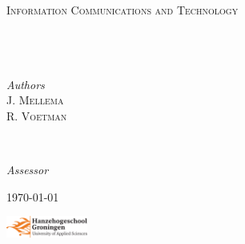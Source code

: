 \begin{titlepage}
	\center


	\textsc{\LARGE \university}\\[1.5cm]

	\textsc{\Large \course}\\[0.5cm]

	\textsc{\large Information Communications and Technology}\\[0.5cm]


	\HRule\\[0.4cm]

	{\huge\bfseries \report}\\[0.4cm]

	\HRule\\[1.5cm]


	\begin{minipage}{0.4\textwidth}
		\begin{flushleft}
			\large
			\textit{Authors}\\
			J. \textsc{Mellema}\\
			R. \textsc{Voetman}
		\end{flushleft}
	\end{minipage}
    ~
	\begin{minipage}{0.4\textwidth}
		\begin{flushright}
			\large
			\textit{Assessor}\\
			\assecorInitials \textsc{\assecorSurname}
		\end{flushright}
	\end{minipage}


	\vfill\vfill\vfill %

	{\large\today}


	\vfill\vfill
	\includegraphics[width=0.2\textwidth]{logo.png}\\[1cm]

\end{titlepage}
